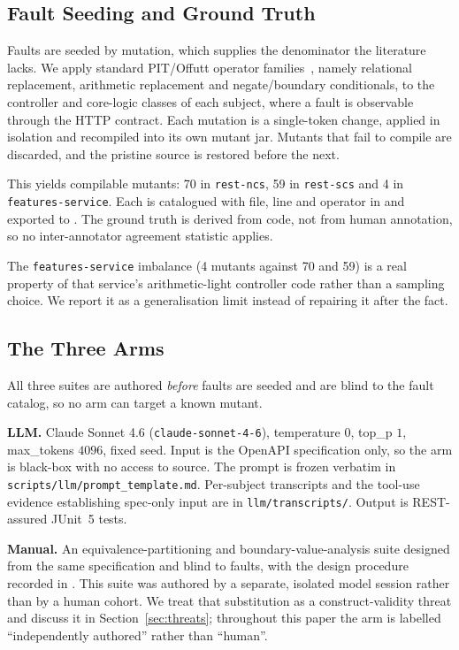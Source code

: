 \subsection{Fault Seeding and Ground Truth}
\label{sec:method-faults}

Faults are seeded by mutation, which supplies the denominator the literature lacks. We apply
standard PIT/Offutt operator families~\cite{pit,offutt}, namely relational replacement,
arithmetic replacement and negate/boundary conditionals, to the controller and core-logic
classes of each subject, where a fault is observable through the HTTP contract. Each mutation
is a single-token change, applied in isolation and recompiled into its own mutant jar. Mutants
that fail to compile are discarded, and the pristine source is restored before the next.

This yields \RQIIn{} compilable mutants: 70 in \texttt{rest-ncs}, 59 in \texttt{rest-scs}
and 4 in \texttt{features-service}. Each is catalogued with file, line and operator in
 and exported to .
The ground truth is derived from code, not from human annotation, so no inter-annotator
agreement statistic applies.

The \texttt{features-service} imbalance (4 mutants against 70 and 59) is a real property of
that service's arithmetic-light controller code rather than a sampling choice. We report it as
a generalisation limit instead of repairing it after the fact.

\subsection{The Three Arms}

All three suites are authored \emph{before} faults are seeded and are blind to the fault
catalog, so no arm can target a known mutant.

\textbf{LLM.} Claude Sonnet 4.6 (\texttt{claude-sonnet-4-6}), temperature $0$, top\_p $1$,
max\_tokens $4096$, fixed seed. Input is the OpenAPI specification only, so the arm is
black-box with no access to source. The prompt is frozen verbatim in
\texttt{scripts/llm/prompt\_template.md}. Per-subject transcripts and the tool-use evidence
establishing spec-only input are in \texttt{llm/transcripts/}. Output is REST-assured JUnit~5
tests.

\textbf{Manual.} An equivalence-partitioning and boundary-value-analysis suite designed from
the same specification and blind to faults, with the design procedure recorded in
. This suite
was authored by a separate, isolated model session rather than by a human cohort. We treat
that substitution as a construct-validity threat and discuss it in
Section~\ref{sec:threats}; throughout this paper the arm is labelled ``independently authored''
rather than ``human''.

